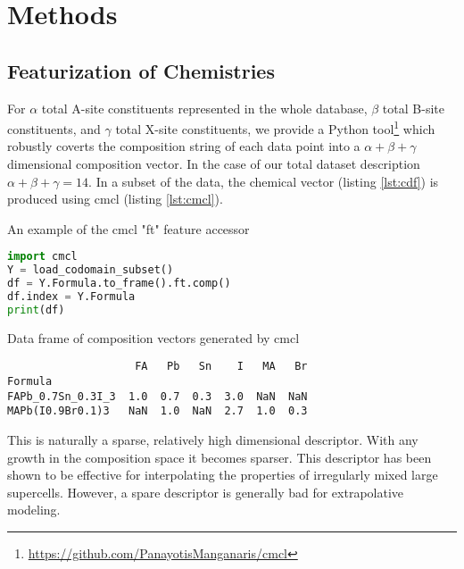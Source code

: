 \section{Methods}
\label{sec:org674fdf1}
\subsection{Featurization of Chemistries}
\label{sec:org260b502}
For \(\alpha\) total A-site constituents represented in the whole database, \(\beta\) total B-site constituents, and \(\gamma\) total X-site constituents, we provide a Python tool\footnote{\url{https://github.com/PanayotisManganaris/cmcl}\label{orgf17672e}} which robustly coverts the composition string of each data point into a \(\alpha + \beta + \gamma\) dimensional composition vector.
In the case of our total dataset description \(\alpha + \beta + \gamma = 14\).
\autocite{yang-2022-high-throug}
In a subset of the data, the chemical vector (listing \ref{lst:cdf}) is produced using cmcl (listing \ref{lst:cmcl}).

\begin{ZZlisting}
  \caption{\label{lst:cmcl} An example of the cmcl "ft" feature accessor}
  \begin{CenteredBox}
    \begin{lstlisting}[language=python]
import cmcl
Y = load_codomain_subset()
df = Y.Formula.to_frame().ft.comp()
df.index = Y.Formula
print(df)
    \end{lstlisting}
  \end{CenteredBox}
\end{ZZlisting}

\begin{ZZlisting}
  \caption{\label{lst:cdf} Data frame of composition vectors generated by cmcl}
  \begin{CenteredBox}
    \begin{lstlisting}
                    FA   Pb   Sn    I   MA   Br
Formula                                        
FAPb_0.7Sn_0.3I_3  1.0  0.7  0.3  3.0  NaN  NaN
MAPb(I0.9Br0.1)3   NaN  1.0  NaN  2.7  1.0  0.3
    \end{lstlisting}
  \end{CenteredBox}
\end{ZZlisting}

This is naturally a sparse, relatively high dimensional descriptor.
With any growth in the composition space it becomes sparser.
This descriptor has been shown to be effective for interpolating the properties of irregularly mixed large supercells.
\autocite{mannodi-kanakkithodi-2022-data-driven}
However, a spare descriptor is generally bad for extrapolative modeling.
\autocite{ghiringhelli-2015-big-data} 

